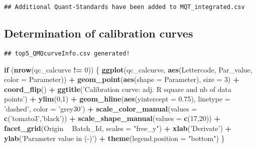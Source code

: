 \documentclass[9pt,]{article}
\newenvironment{Shaded}{\begin{snugshade}}{\end{snugshade}}
\newcommand{\KeywordTok}[1]{\textcolor[rgb]{0.13,0.29,0.53}{\textbf{#1}}}
\newcommand{\DataTypeTok}[1]{\textcolor[rgb]{0.13,0.29,0.53}{#1}}
\newcommand{\DecValTok}[1]{\textcolor[rgb]{0.00,0.00,0.81}{#1}}
\newcommand{\FloatTok}[1]{\textcolor[rgb]{0.00,0.00,0.81}{#1}}
\newcommand{\StringTok}[1]{\textcolor[rgb]{0.31,0.60,0.02}{#1}}
\newcommand{\ControlFlowTok}[1]{\textcolor[rgb]{0.13,0.29,0.53}{\textbf{#1}}}
\newcommand{\OperatorTok}[1]{\textcolor[rgb]{0.81,0.36,0.00}{\textbf{#1}}}
\newcommand{\NormalTok}[1]{#1}
\begin{document}
\begin{verbatim}
## Additional Quant-Standards have been added to MQT_integrated.csv
\end{verbatim}

\subsection{Determination of calibration
curves}\label{determination-of-calibration-curves}

\begin{verbatim}
## top5_QMQcurveInfo.csv generated!
\end{verbatim}

\begin{Shaded}
\begin{Highlighting}[]
\ControlFlowTok{if}\NormalTok{ (}\KeywordTok{nrow}\NormalTok{(qc_calcurve }\OperatorTok{!=}\StringTok{ }\DecValTok{0}\NormalTok{)) \{}
  \KeywordTok{ggplot}\NormalTok{(qc_calcurve, }\KeywordTok{aes}\NormalTok{(Lettercode, Par_value, }\DataTypeTok{color =}\NormalTok{ Parameter)) }\OperatorTok{+}
\StringTok{        }\KeywordTok{geom_point}\NormalTok{(}\KeywordTok{aes}\NormalTok{(}\DataTypeTok{shape =}\NormalTok{ Parameter), }\DataTypeTok{size =} \DecValTok{3}\NormalTok{) }\OperatorTok{+}
\StringTok{    }\KeywordTok{coord_flip}\NormalTok{() }\OperatorTok{+}
\StringTok{    }\KeywordTok{ggtitle}\NormalTok{(}\StringTok{'Calibration curve: adj. R square and nb of data points'}\NormalTok{) }\OperatorTok{+}
\StringTok{    }\KeywordTok{ylim}\NormalTok{(}\DecValTok{0}\NormalTok{,}\DecValTok{1}\NormalTok{) }\OperatorTok{+}
\StringTok{    }\KeywordTok{geom_hline}\NormalTok{(}\KeywordTok{aes}\NormalTok{(}\DataTypeTok{yintercept =} \FloatTok{0.75}\NormalTok{), }\DataTypeTok{linetype =} \StringTok{'dashed'}\NormalTok{, }\DataTypeTok{color =} \StringTok{'grey30'}\NormalTok{) }\OperatorTok{+}
\StringTok{    }\KeywordTok{scale_color_manual}\NormalTok{(}\DataTypeTok{values =} \KeywordTok{c}\NormalTok{(}\StringTok{'tomato3'}\NormalTok{,}\StringTok{'black'}\NormalTok{)) }\OperatorTok{+}
\StringTok{    }\KeywordTok{scale_shape_manual}\NormalTok{(}\DataTypeTok{values =} \KeywordTok{c}\NormalTok{(}\DecValTok{17}\NormalTok{,}\DecValTok{20}\NormalTok{)) }\OperatorTok{+}
\StringTok{    }\KeywordTok{facet_grid}\NormalTok{(Origin }\OperatorTok{~}\StringTok{ }\NormalTok{Batch_Id, }\DataTypeTok{scales =} \StringTok{"free_y"}\NormalTok{) }\OperatorTok{+}
\StringTok{        }\KeywordTok{xlab}\NormalTok{(}\StringTok{'Derivate'}\NormalTok{) }\OperatorTok{+}
\StringTok{        }\KeywordTok{ylab}\NormalTok{(}\StringTok{'Parameter value in (-)'}\NormalTok{) }\OperatorTok{+}
\StringTok{    }\KeywordTok{theme}\NormalTok{(}\DataTypeTok{legend.position =} \StringTok{"bottom"}\NormalTok{)}
\NormalTok{\}}
\end{Highlighting}
\end{Shaded}
\end{document}
